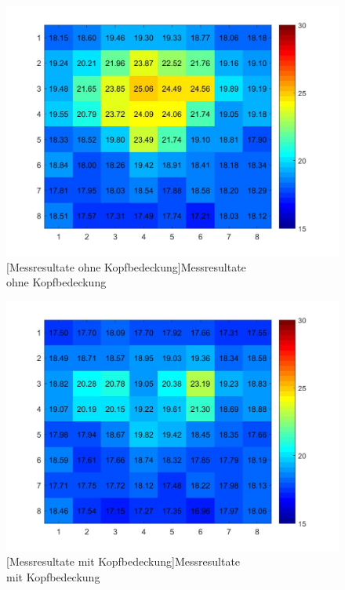 \begin{figure}[!ht]
	\centering
	\begin{minipage}[b]{0.49\linewidth}
		\centering	
		\includegraphics[width=1.0\linewidth]{fig/person_175_shirt.jpg}
		[Messresultate ohne Kopfbedeckung]{Messresultate\\ ohne Kopfbedeckung}
		\label{fig:ohneHut}
	\end{minipage}
	\hfill
	\begin{minipage}[b]{0.49\linewidth}
		\centering
		\includegraphics[width=1.0\linewidth]{fig/person_175_kopfbedeckung.jpg}
		[Messresultate mit Kopfbedeckung]{Messresultate\\ mit Kopfbedeckung}
		\label{fig:mitHut}	
	\end{minipage}
\end{figure}


